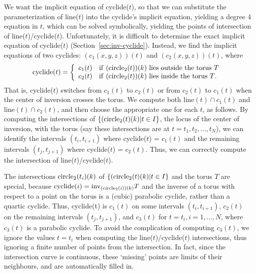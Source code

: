 We want the implicit equation of cyclide($t$),
so that we can substitute the parameterization of line($t$) into the
cyclide's implicit equation, yielding a degree 4 equation in $t$,
which can be solved symbolically, yielding the points of 
intersection of line($t$)/cyclide($t$).
Unfortunately, it is difficult to determine the exact implicit equation of 
cyclide($t$) (Section~\ref{sec:inv-cyclide}).
Instead, we find the implicit equations of two cyclides: 
$(c_1(x,y,z))(t)$ and $(c_2(x,y,z))(t)$, where
\[ {\rm cyclide}(t) = \left\{ \begin{array}{ll}
	c_1(t) & {\rm if\ } ({\rm circle}_2(t))(k) 
		\mbox{ lies outside the torus $T$} \\
	c_2(t) & {\rm if\ } ({\rm circle}_2(t))(k) 
		\mbox{ lies inside the torus $T$}.
   \end{array} \right. 
\]
That is, cyclide($t$) switches from $c_1(t)$ to $c_2(t)$ or from $c_2(t)$ to 
$c_1(t)$ when the center of inversion crosses the torus.
We compute both $\mbox{line}(t) \cap c_1(t)$ and $\mbox{line}(t) \cap c_2(t)$,
and then choose the appropriate one for each $t$, as follows.
By computing the intersections
of $\{({\rm circle}_2(t)(k) | \mbox{$t \in I$}\}$, 
the locus of the center of inversion, 
with the torus (say these intersections are at $t = t_1,t_2,\ldots,t_N$),
we can identify the intervals $(t_i,t_{i+1})$ where cyclide($t$) = $c_1(t)$
and the remaining intervals $(t_j,t_{j+1})$ where cyclide($t$) = $c_2(t)$.
Thus, we can correctly compute the intersection of line($t$)/cyclide($t$).


\begin{rmk}
\label{rmk:noton}
The intersections ${\rm circle}_2(t_i)(k)$ of 
$\{({\rm circle}_2(t)(k) | \mbox{$t \in I$}\}$ and the torus $T$ are special,
because ${\rm cyclide}(i) = {\rm inv}_{({\rm circle}_{2}(i))(k)} T$
and the inverse of a torus with respect to a point on the torus 
is a (cubic) parabolic cyclide, rather than a quartic cyclide.
Thus, cyclide(t) is $c_1(t)$ on some intervals $(t_i,t_{i+1})$,
$c_2(t)$ on the remaining intervals $(t_j,t_{j+1})$,
and $c_3(t)$ for $t = t_i, i = 1,\ldots,N$, where $c_3(t)$ is a parabolic 
cyclide.
To avoid the complication of computing $c_3(t)$,
we ignore the values $t=t_i$ when computing the line($t$)/cyclide($t$) 
intersections, thus ignoring
a finite number of points from the intersection.
In fact, since the intersection curve is continuous,
these `missing' points are limits of their neighbours,
and are automatically filled in.
\end{rmk}

